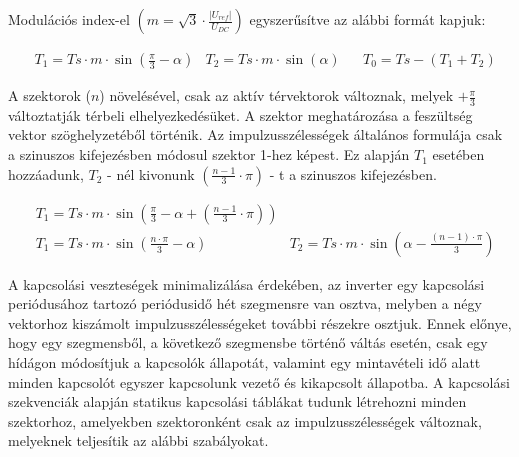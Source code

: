 \documentclass[a4paper,12pt]{article}
\newcommand\Pbracket[1]{\left(#1\right)}
\begin{document}
				
				
				 Modulációs index-el  $\Pbracket { m = \sqrt{3} \cdot \frac{|U_{ref}|}{U_{DC}}} $  egyszerűsítve az alábbi formát kapjuk: 
	
				\begin{align}
					& T_{1}  = Ts \cdot m \cdot \sin \Pbracket {\frac{\pi}{3} - \alpha }
					& T_{2} = Ts \cdot m \cdot \sin(\alpha ) &
					& T_{0} = Ts - (T_{1} + T_{2} )
				\end{align}
			
				A szektorok ($ n $) növelésével, csak az aktív térvektorok változnak, melyek $ +\frac{\pi}{3} $ változtatják térbeli elhelyezkedésüket. A szektor meghatározása a feszültség vektor szöghelyzetéből történik. Az impulzusszélességek általános formulája csak a szinuszos kifejezésben módosul szektor 1-hez képest. Ez alapján $ T_{1} $ esetében hozzáadunk, $ T_{2} $ - nél kivonunk $ \Pbracket { \frac{n-1}{3} \cdot \pi }$ - t a szinuszos kifejezésben.
				
				
				\begin{align}
					& T_{1}  = Ts \cdot m \cdot \sin \Pbracket {\frac{\pi}{3} - \alpha + \Pbracket { \frac{n-1}{3} \cdot \pi }  } \\
					& T_{1} = Ts \cdot m \cdot \sin \Pbracket {  \frac{n \cdot \pi}{3} - \alpha } 
					& T_{2} = Ts \cdot m \cdot \sin \Pbracket { \alpha -  \frac{(n-1) \cdot \pi }{3} } 
				\end{align}
				
				A kapcsolási veszteségek minimalizálása érdekében, az inverter egy kapcsolási periódusához tartozó periódusidő hét szegmensre van osztva, melyben a négy vektorhoz kiszámolt impulzusszélességeket további részekre osztjuk. Ennek előnye, hogy egy szegmensből, a következő szegmensbe történő váltás esetén, csak egy hídágon módosítjuk a kapcsolók állapotát, valamint egy mintavételi idő alatt minden kapcsolót egyszer kapcsolunk vezető és kikapcsolt állapotba. A kapcsolási szekvenciák alapján statikus kapcsolási táblákat tudunk létrehozni minden szektorhoz, amelyekben szektoronként csak az impulzusszélességek változnak, melyeknek teljesítik az alábbi szabályokat.
				
\end{document}
